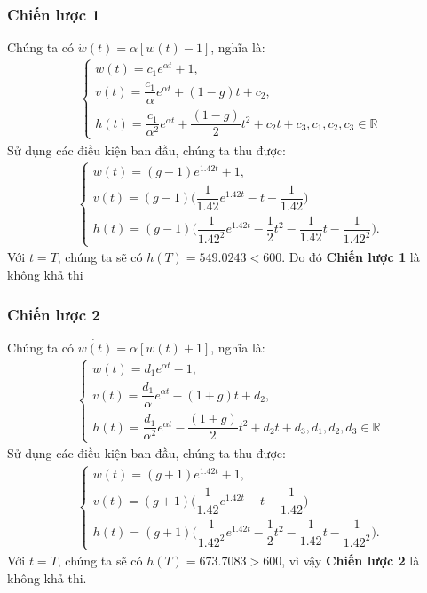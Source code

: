 \documentclass[12pt,a4paper]{report}
\begin{document}
\subsubsection{Chiến lược 1}
Chúng ta có $\dot{w}(t) = \alpha[w(t) - 1]$, nghĩa là: 
\begin{eqnarray}
	\begin{cases}
		w(t) = c_1e^{\alpha t} + 1, \\ v(t) = \dfrac{c_1}{\alpha}e^{\alpha t} + (1-g)t + c_2, \\ h(t) = \dfrac{c_1}{\alpha^2}e^{\alpha t} + \dfrac{(1-g)}{2}t^2+c_2t+c_3, c_1, c_2, c_3 \in \mathbb{R}
	\end{cases}
\end{eqnarray} 
Sử dụng các điều kiện ban đầu, chúng ta thu được:
\begin{eqnarray}
	\begin{cases}
		w(t) = (g-1)e^{1.42t}+1, \\ v(t) = (g-1)\bigg(\dfrac{1}{1.42}e^{1.42t}-t-\dfrac{1}{1.42}\bigg) \\ h(t) = (g-1)\bigg(\dfrac{1}{1.42^2}e^{1.42t}-\dfrac{1}{2}t^2-\dfrac{1}{1.42}t - \dfrac{1}{1.42^2}\bigg).
	\end{cases}
\end{eqnarray}
 Với $t = T$, chúng ta sẽ có $h(T) = 549.0243 < 600.$ Do đó \textbf{Chiến lược 1} là không khả thi
 \subsubsection{Chiến lược 2} Chúng ta có $\dot{w(t)} = \alpha[w(t) + 1]$, nghĩa là: 
 \begin{eqnarray}
 	\begin{cases}
 		w(t) = d_1e^{\alpha t} - 1, \\ v(t) = \dfrac{d_1}{\alpha}e^{\alpha t} - (1+g)t + d_2, \\ h(t) = \dfrac{d_1}{\alpha^2}e^{\alpha t} - \dfrac{(1+g)}{2}t^2+d_2t+d_3, d_1, d_2, d_3 \in \mathbb{R}
 	\end{cases}
 \end{eqnarray} 
Sử dụng các điều kiện ban đầu, chúng ta thu được: 
\begin{eqnarray}
	\begin{cases}
		w(t) = (g+1)e^{1.42t}+1, \\ v(t) = (g+1)\bigg(\dfrac{1}{1.42}e^{1.42t}-t-\dfrac{1}{1.42}\bigg) \\ h(t) = (g+1)\bigg(\dfrac{1}{1.42^2}e^{1.42t}-\dfrac{1}{2}t^2-\dfrac{1}{1.42}t - \dfrac{1}{1.42^2}\bigg).
	\end{cases}
\end{eqnarray}
Với $t = T$, chúng ta sẽ có $h(T) = 673.7083 > 600$, vì vậy \textbf{Chiến lược 2} là không khả thi.
\end{document}
